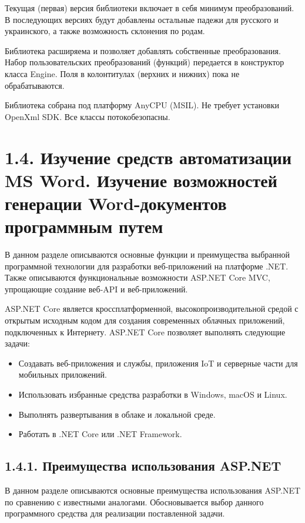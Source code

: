 Текущая (первая) версия библиотеки включает в себя минимум преобразований. В последующих версиях будут добавлены остальные падежи для русского и украинского, а также возможность склонения по родам.

Библиотека расширяема и позволяет добавлять собственные преобразования. Набор пользовательских преобразований (функций) передается в конструктор класса Engine.
Поля в колонтитулах (верхних и нижних) пока не обрабатываются.

Библиотека собрана под платформу AnyCPU (MSIL). Не требует установки OpenXml SDK. Все классы потокобезопасны.


\section{1.4. Изучение средств автоматизации MS Word. Изучение возможностей генерации Word-документов программным путем}


В данном разделе  описываются основные функции и  преимущества выбранной программной технологии для разработки веб-приложений на платформе .NET. Также  описываются функциональные возможности ASP.NET Core MVC, упрощающие создание веб-API и веб-приложений.


ASP.NET Core является кроссплатформенной, высокопроизводительной средой с открытым исходным кодом для создания современных облачных приложений, подключенных к Интернету. ASP.NET Core позволяет выполнять следующие задачи:

\begin{itemize}
\item Создавать веб-приложения и службы, приложения IoT и серверные части для мобильных приложений.
\item Использовать избранные средства разработки в Windows, macOS и Linux.
\item Выполнять развертывания в облаке и локальной среде.
\item Работать в .NET Core или .NET Framework.

\end{itemize}

\subsection{1.4.1. Преимущества использования ASP.NET}


В данном разделе описываются основные преимущества использования ASP.NET по сравнению с известными аналогами. Обосновывается выбор данного программного средства для реализации поставленной задачи.



